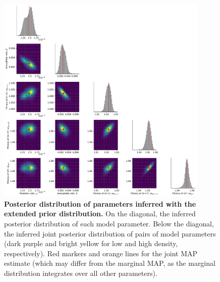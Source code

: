 \documentclass[12pt]{extarticle}
\begin{document}
\begin{figure}[p]
  \centering
  \includegraphics[width=0.9\textwidth]{../figures/posterior-alt.pdf}
  \caption{
  \textbf{Posterior distribution of parameters inferred with the extended prior distribution.}
On the diagonal, the inferred posterior distribution of each model parameter. 
Below the diagonal, the inferred joint posterior distribution of pairs of model parameters (dark purple and bright yellow for low and high density, respectively). Red markers and orange lines for the joint MAP estimate (which may differ from the marginal MAP, as the marginal distribution integrates over all other parameters).
} 
  \label{fig:posterior-alt}
\end{figure}
\end{document}
